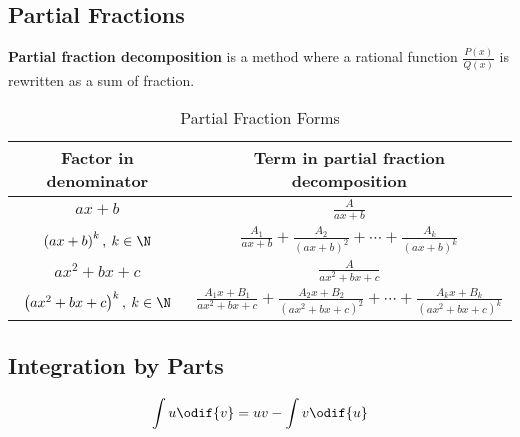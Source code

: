 \documentclass{article}
\begin{document}
\subsection{Partial Fractions}
\begin{definition}
    \textbf{Partial fraction decomposition} is a \linebreak method where
    a rational function \(\displaystyle \frac{P\left( x \right)}{Q\left( x \right)}\) is rewritten
    as a sum of fraction.
\end{definition}
\begin{table}[H]
    \renewcommand*{\arraystretch}{1.5}
    \centering
    \begin{tabular}{c c}
        \toprule
        \textbf{Factor in denominator}            & \textbf{Term in partial fraction decomposition}                                                                                                    \\
        \midrule
        \(ax+b\)                                  & \(\displaystyle \frac{A}{ax+b}\)                                                                                                                   \\[10pt]
        \(\left(ax+b\right)^k, \: k \in \N\)      & \(\displaystyle \frac{A_1}{ax+b} + \frac{A_2}{\left( ax+b \right)^2} + \cdots + \frac{A_k}{\left( ax+b \right)^k}\)                                \\[10pt]
        \(ax^2+bx+c\)                             & \(\displaystyle \frac{A}{ax^2+bx+c}\)                                                                                                              \\[10pt]
        \(\left(ax^2+bx+c\right)^k, \: k \in \N\) & \(\displaystyle \frac{A_1x+B_1}{ax^2+bx+c} + \frac{A_2x+B_2}{\left( ax^2+bx+c \right)^2} + \cdots + \frac{A_k x+B_k}{\left( ax^2+bx+c \right)^k}\) \\[10pt]
        \bottomrule
    \end{tabular}
    \caption{Partial Fraction Forms}
\end{table}
\subsection{Integration by Parts}
\begin{theorem}
    \begin{equation*}
        \int u \odif{v} = uv - \int v \odif{u}
    \end{equation*}
\end{theorem}
\end{document}
